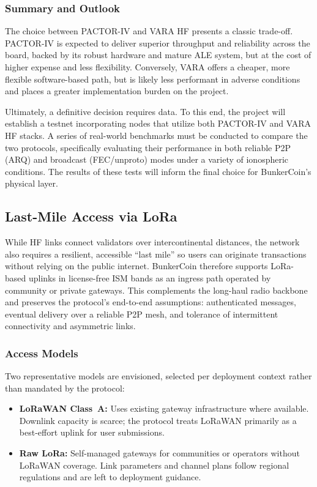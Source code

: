 \documentclass{article}
\begin{document}
\subsubsection{Summary and Outlook}
\label{sec:phys_summary}

The choice between PACTOR-IV and VARA HF presents a classic trade-off. PACTOR-IV is expected to deliver superior throughput and reliability across the board, backed by its robust hardware and mature ALE system, but at the cost of higher expense and less flexibility. Conversely, VARA offers a cheaper, more flexible software-based path, but is likely less performant in adverse conditions and places a greater implementation burden on the project.

Ultimately, a definitive decision requires data. To this end, the project will establish a testnet incorporating nodes that utilize both PACTOR-IV and VARA HF stacks. A series of real-world benchmarks must be conducted to compare the two protocols, specifically evaluating their performance in both reliable P2P (ARQ) and broadcast (FEC/unproto) modes under a variety of ionospheric conditions. The results of these tests will inform the final choice for BunkerCoin's physical layer.

\subsection{Last-Mile Access via LoRa}
\label{sec:lora}

While HF links connect validators over intercontinental distances, the network also requires a resilient, accessible ``last mile'' so users can originate transactions without relying on the public internet. BunkerCoin therefore supports LoRa-based uplinks in license-free ISM bands as an ingress path operated by community or private gateways. This complements the long-haul radio backbone and preserves the protocol’s end-to-end assumptions: authenticated messages, eventual delivery over a reliable P2P mesh, and tolerance of intermittent connectivity and asymmetric links.

\subsubsection{Access Models}

Two representative models are envisioned, selected per deployment context rather than mandated by the protocol:
\begin{itemize}
    \item \textbf{LoRaWAN Class~A:} Uses existing gateway infrastructure where available. Downlink capacity is scarce; the protocol treats LoRaWAN primarily as a best-effort uplink for user submissions.
    \item \textbf{Raw LoRa:} Self-managed gateways for communities or operators without LoRaWAN coverage. Link parameters and channel plans follow regional regulations and are left to deployment guidance.
\end{itemize}
\end{document}
